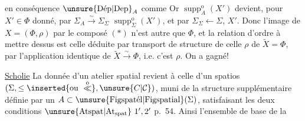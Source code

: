 en conséquence $\unsure{\mathrm{D\acute ep}|\mathrm{Dep}}_A$ comme
Or $\operatorname{supp}^{\mathrm{o}}_A(X')$ devient, pour $X'\in\Phi$\inserted{$\subset\Sigma$} donné, par $\mathbb\Sigma_A\xrightarrow{\sim}\mathbb\Sigma_\Sigma$ $\operatorname{supp}^{\mathrm{o}}_\Sigma(X')$, et par $\mathbb\Sigma_\Sigma\leftarrow\Sigma$, $X'$.
Donc l'image de $X=(\Phi,\rho)$ par  le composé $(*)$ n'est autre que $\Phi$, et la relation d'ordre à mettre dessus est celle déduite par transport de structure de celle $\rho$ de $\widetilde X=\Phi$, par l'application identique de $\widetilde X\xrightarrow{\sim}\Phi$, i.e. c'est $\rho$.
On a gagné!

\uline{Scholie} La donnée d'un atelier spatial revient à celle d'un spatios $(\Sigma,\leq\inserted{\text{ou }\overset{\mathrm{o}}{\ll}},\unsure{C|\mathcal C})$, muni de la structure supplémentaire définie par un $A\subset\unsure{\mathrm{Figspat\acute el}|\mathrm{Figspatial}}(\Sigma)$, satisfaisant les deux conditions $\unsure{\mathrm{Atspat}|\mathrm{At}_{\mathrm{spat}}}\ 1',2'$ p.\ 54. Ainsi l'ensemble de base de la


